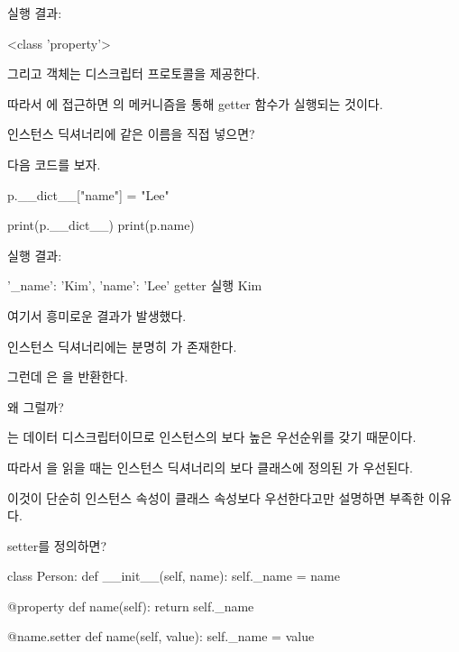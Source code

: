 실행 결과:

\begin{dhkzsh}
<class 'property'>
\end{dhkzsh}

그리고  객체는 디스크립터 프로토콜을 제공한다.

따라서 에 접근하면 의  메커니즘을 통해 getter 함수가 실행되는 것이다.

\begin{dhknote}
\begin{dhksmry}[centered]
인스턴스 딕셔너리에 같은 이름을 직접 넣으면?
\end{dhksmry}
\end{dhknote}

다음 코드를 보자.

\begin{dhkcode}
p.__dict__["name"] = "Lee"

print(p.__dict__)
print(p.name)
\end{dhkcode}

실행 결과:

\begin{dhkzsh}
{'_name': 'Kim', 'name': 'Lee'}
getter 실행
Kim
\end{dhkzsh}

여기서 흥미로운 결과가 발생했다.

인스턴스 딕셔너리에는 분명히 가 존재한다.

그런데 은 을 반환한다.

왜 그럴까?

는 데이터 디스크립터이므로 인스턴스의 보다 높은 우선순위를 갖기 때문이다.

따라서 을 읽을 때는 인스턴스 딕셔너리의 보다 클래스에 정의된 가 우선된다.

이것이 단순히 인스턴스 속성이 클래스 속성보다 우선한다고만 설명하면 부족한 이유다.

\begin{dhknote}
\begin{dhksmry}[centered]
setter를 정의하면?
\end{dhksmry}
\end{dhknote}

\begin{dhkcode}
class Person:
    def __init__(self, name):
        self._name = name

    @property
    def name(self):
        return self._name

    @name.setter
    def name(self, value):
        self._name = value
\end{dhkcode}


